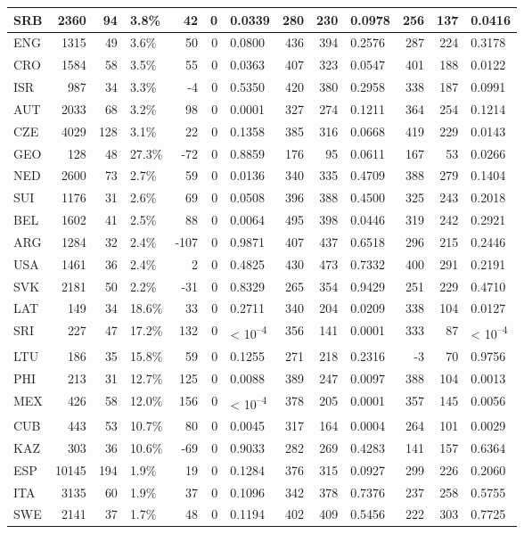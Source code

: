 \begin{tabular}{l|r|r|l|r|r|l|r|r|l|r|r|l}
\hline
SRB & 2360 & 94 & 3.8\% & 42 & 0 & 0.0339 & 280 & 230 & 0.0978 & 256 & 137 & 0.0416\\
\hline
ENG & 1315 & 49 & 3.6\% & 50 & 0 & 0.0800 & 436 & 394 & 0.2576 & 287 & 224 & 0.3178\\
\hline
CRO & 1584 & 58 & 3.5\% & 55 & 0 & 0.0363 & 407 & 323 & 0.0547 & 401 & 188 & 0.0122\\
\hline
ISR & 987 & 34 & 3.3\% & -4 & 0 & 0.5350 & 420 & 380 & 0.2958 & 338 & 187 & 0.0991\\
\hline
AUT & 2033 & 68 & 3.2\% & 98 & 0 & 0.0001 & 327 & 274 & 0.1211 & 364 & 254 & 0.1214\\
\hline
CZE & 4029 & 128 & 3.1\% & 22 & 0 & 0.1358 & 385 & 316 & 0.0668 & 419 & 229 & 0.0143\\
\hline
GEO & 128 & 48 & 27.3\% & -72 & 0 & 0.8859 & 176 & 95 & 0.0611 & 167 & 53 & 0.0266\\
\hline
NED & 2600 & 73 & 2.7\% & 59 & 0 & 0.0136 & 340 & 335 & 0.4709 & 388 & 279 & 0.1404\\
\hline
SUI & 1176 & 31 & 2.6\% & 69 & 0 & 0.0508 & 396 & 388 & 0.4500 & 325 & 243 & 0.2018\\
\hline
BEL & 1602 & 41 & 2.5\% & 88 & 0 & 0.0064 & 495 & 398 & 0.0446 & 319 & 242 & 0.2921\\
\hline
ARG & 1284 & 32 & 2.4\% & -107 & 0 & 0.9871 & 407 & 437 & 0.6518 & 296 & 215 & 0.2446\\
\hline
USA & 1461 & 36 & 2.4\% & 2 & 0 & 0.4825 & 430 & 473 & 0.7332 & 400 & 291 & 0.2191\\
\hline
SVK & 2181 & 50 & 2.2\% & -31 & 0 & 0.8329 & 265 & 354 & 0.9429 & 251 & 229 & 0.4710\\
\hline
LAT & 149 & 34 & 18.6\% & 33 & 0 & 0.2711 & 340 & 204 & 0.0209 & 338 & 104 & 0.0127\\
\hline
SRI & 227 & 47 & 17.2\% & 132 & 0 & < 10\textsuperscript{--4} & 356 & 141 & 0.0001 & 333 & 87 & < 10\textsuperscript{--4}\\
\hline
LTU & 186 & 35 & 15.8\% & 59 & 0 & 0.1255 & 271 & 218 & 0.2316 & -3 & 70 & 0.9756\\
\hline
PHI & 213 & 31 & 12.7\% & 125 & 0 & 0.0088 & 389 & 247 & 0.0097 & 388 & 104 & 0.0013\\
\hline
MEX & 426 & 58 & 12.0\% & 156 & 0 & < 10\textsuperscript{--4} & 378 & 205 & 0.0001 & 357 & 145 & 0.0056\\
\hline
CUB & 443 & 53 & 10.7\% & 80 & 0 & 0.0045 & 317 & 164 & 0.0004 & 264 & 101 & 0.0029\\
\hline
KAZ & 303 & 36 & 10.6\% & -69 & 0 & 0.9033 & 282 & 269 & 0.4283 & 141 & 157 & 0.6364\\
\hline
ESP & 10145 & 194 & 1.9\% & 19 & 0 & 0.1284 & 376 & 315 & 0.0927 & 299 & 226 & 0.2060\\
\hline
ITA & 3135 & 60 & 1.9\% & 37 & 0 & 0.1096 & 342 & 378 & 0.7376 & 237 & 258 & 0.5755\\
\hline
SWE & 2141 & 37 & 1.7\% & 48 & 0 & 0.1194 & 402 & 409 & 0.5456 & 222 & 303 & 0.7725\\
\hline
\end{tabular}
